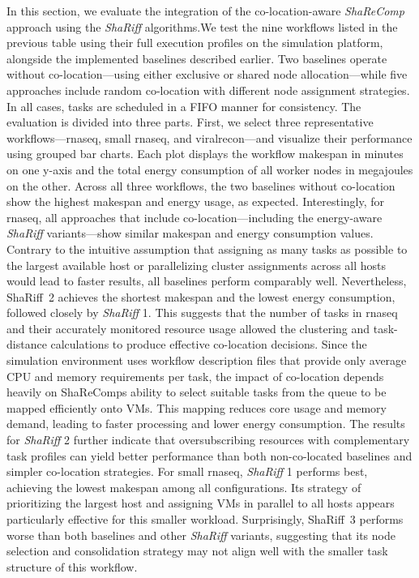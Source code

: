 In this section, we evaluate the integration of the co-location-aware \textit{ShaReComp} approach using the \textit{ShaRiff} algorithms.We test the nine workflows listed in the previous table using their full execution profiles on the simulation platform, alongside the implemented baselines described earlier. Two baselines operate without co-location—using either exclusive or shared node allocation—while five approaches include random co-location with different node assignment strategies. In all cases, tasks are scheduled in a FIFO manner for consistency.
The evaluation is divided into three parts. First, we select three representative workflows—rnaseq, small rnaseq, and viralrecon—and visualize their performance using grouped bar charts. Each plot displays the workflow makespan in minutes on one y-axis and the total energy consumption of all worker nodes in megajoules on the other.
Across all three workflows, the two baselines without co-location show the highest makespan and energy usage, as expected. Interestingly, for rnaseq, all approaches that include co-location—including the energy-aware \textit{ShaRiff} variants—show similar makespan and energy consumption values. Contrary to the intuitive assumption that assigning as many tasks as possible to the largest available host or parallelizing cluster assignments across all hosts would lead to faster results, all baselines perform comparably well. Nevertheless, ShaRiff~2 achieves the shortest makespan and the lowest energy consumption, followed closely by \textit{ShaRiff} 1. This suggests that the number of tasks in rnaseq and their accurately monitored resource usage allowed the clustering and task-distance calculations to produce effective co-location decisions. Since the simulation environment uses workflow description files that provide only average CPU and memory requirements per task, the impact of co-location depends heavily on ShaReComps ability to select suitable tasks from the queue to be mapped efficiently onto VMs. This mapping reduces core usage and memory demand, leading to faster processing and lower energy consumption. The results for \textit{ShaRiff} 2 further indicate that oversubscribing resources with complementary task profiles can yield better performance than both non-co-located baselines and simpler co-location strategies.
For small rnaseq, \textit{ShaRiff} 1 performs best, achieving the lowest makespan among all configurations. Its strategy of prioritizing the largest host and assigning VMs in parallel to all hosts appears particularly effective for this smaller workload. Surprisingly, ShaRiff~3 performs worse than both baselines and other \textit{ShaRiff} variants, suggesting that its node selection and consolidation strategy may not align well with the smaller task structure of this workflow.
